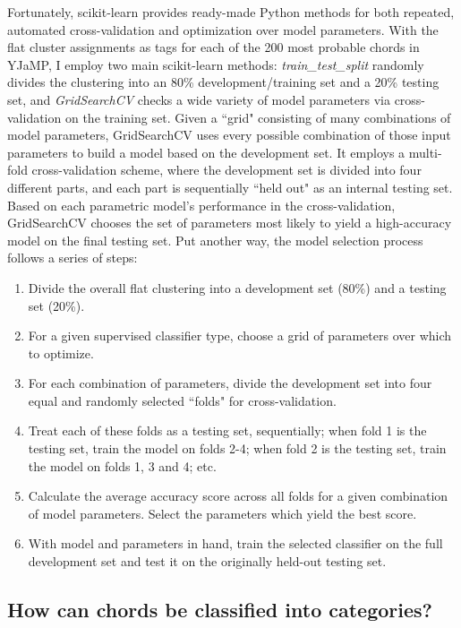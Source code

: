 Fortunately, scikit-learn provides ready-made Python methods for both repeated, automated cross-validation and optimization over model parameters.  With the flat cluster assignments as tags for each of the 200 most probable chords in YJaMP, I employ two main scikit-learn methods: \emph{train_test_split} randomly divides the clustering into an 80\% development/training set and a 20\% testing set, and \emph{GridSearchCV} checks a wide variety of model parameters via cross-validation on the training set.  Given a ``grid" consisting of many combinations of model parameters, GridSearchCV uses every possible combination of those input parameters to build a model based on the development set.  It employs a multi-fold cross-validation scheme, where the development set is divided into four different parts, and each part is sequentially ``held out" as an internal testing set.  Based on each parametric model's performance in the cross-validation, GridSearchCV chooses the set of parameters most likely to yield a high-accuracy model on the final testing set.  Put another way, the model selection process follows a series of steps:
\begin{enumerate}
	\item Divide the overall flat clustering into a development set (80\%) and a testing set (20\%).
	\item For a given supervised classifier type, choose a grid of parameters over which to optimize.
	\item For each combination of parameters, divide the development set into four equal and randomly selected ``folds" for cross-validation.
	\item Treat each of these folds as a testing set, sequentially; when fold 1 is the testing set, train the model on folds 2-4; when fold 2 is the testing set, train the model on folds 1, 3 and 4; etc.
	\item Calculate the average accuracy score across all folds for a given combination of model parameters.  Select the parameters which yield the best score.
	\item With model and parameters in hand, train the selected classifier on the full development set and test it on the originally held-out testing set.
\end{enumerate}

\subsection{How can chords be classified into categories?}


